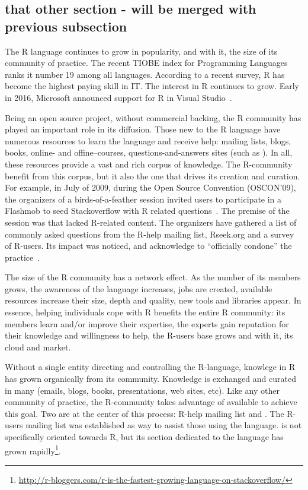 \subsection{that other section - will be merged with previous subsection}


The R language continues to grow in popularity, and with it, the size of its community of practice. The recent TIOBE index for Programming Languages ranks it
number 19 among all languages.  According to a recent survey, R has become the highest paying skill in IT. The interest in R continues to grow.
Early in 2016, Microsoft announced support for R in Visual Studio~\cite{RMicrosoft2016}.

Being an open source project, without commercial backing, the R community has played an important role in its diffusion. Those new to the R language have
numerous resources to learn the language and receive help: mailing lists, blogs, books, online- and offine--courses, questions-and-answers sites (such as
\SO). In all, these resources provide a vast and rich corpus of knowledge. The R-community benefit from this corpus, but it also the one that drives its
creation and curation.  For example, in July of 2009, during the Open Source Convention (OSCON'09), the organizers of a birds-of-a-feather session invited users
to participate in a Flashmob to seed Stackoverflow with R related questions~\cite{OSCONRFlashMob2009}. The premise of the session was that \SO lacked R-related
content. The organizers have gathered a list of commonly asked questions from the R-help mailing list, Rseek.org and a survey of R-users. Its impact was
noticed, and \SO acknowledge to ``officially condone'' the practice~\cite{SOFlashMob2009}.

The size of the R community has a network effect. As the number of its members grows, the awareness of the language increases, jobs are created, available
resources increase their size, depth and quality, new tools and libraries appear. In essence, helping individuals cope with R benefits the entire R
community: its members learn and/or improve their expertise, the experts gain reputation for their knowledge and willingness to help, the R-users base grows and
with it, its cloud and market.

Without a single entity directing and controlling the R-language, knowlege in R has grown organically from its community. Knowledge is exchanged and curated in
many \channels (emails, blogs, books, presentations, web sites, etc). Like any other community of practice, the R-community takes advantage of available \channels
to achieve this goal.
Two \channels are at the center of this process: R-help mailing list and \SO. The R-users mailing list was established  as way to assist those using
the language. \SO is not specifically oriented towards R, but its section dedicated to the language has grown rapidly\footnote{\href{http://r-bloggers.com/r-is-the-fastest-growing-language-on-stackoverflow/}{http://r-bloggers.com/r-is-the-fastest-growing-language-on-stackoverflow/}}.


